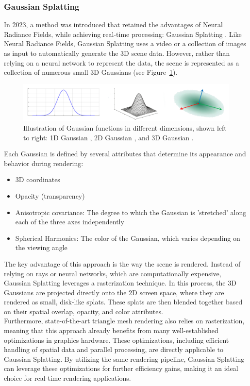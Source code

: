 \documentclass[12pt]{article}
\begin{document}
\subsubsection{Gaussian Splatting}
In 2023, a method was introduced that retained the advantages of Neural Radiance Fields, while achieving real-time processing: Gaussian Splatting \cite{OriginalSplatting}. Like Neural Radiance Fields, Gaussian Splatting uses a video or a collection of images as input to automatically generate the 3D scene data. However, rather than relying on a neural network to represent the data, the scene is represented as a collection of numerous small 3D Gaussians (see Figure~\ref{fig:Form}).
\begin{figure}[h!]
	\centering
	\includegraphics[width=\textwidth]{Images/GaussianForm.png}
	\caption{Illustration of Gaussian functions in different dimensions, shown left to right: 1D Gaussian \cite{1DGaussian}, 2D Gaussian \cite{2DGaussian}, and 3D Gaussian \cite{3DGaussian}.}
	\label{fig:Form}
\end{figure}
\newpage  \noindent
Each Gaussian is defined by several attributes that determine its appearance and behavior during rendering:
\begin{itemize}
	\item 3D coordinates
	\item Opacity (transparency)
	\item Anisotropic covariance: The degree to which the Gaussian is 'stretched' along each of the three axes independently
	\item Spherical Harmonics: The color of the Gaussian, which varies depending on the viewing angle
\end{itemize}
The key advantage of this approach is the way the scene is rendered. Instead of relying on rays or neural networks, which are computationally expensive, Gaussian Splatting leverages a rasterization technique. In this process, the 3D Gaussians are projected directly onto the 2D screen space, where they are rendered as small, disk-like splats. These splats are then blended together based on their spatial overlap, opacity, and color attributes.\\
Furthermore, state-of-the-art triangle mesh rendering also relies on rasterization, meaning that this approach already benefits from many well-established optimizations in graphics hardware. These optimizations, including efficient handling of spatial data and parallel processing, are directly applicable to Gaussian Splatting. By utilizing the same rendering pipeline, Gaussian Splatting can leverage these optimizations for further efficiency gains, making it an ideal choice for real-time rendering applications.
\end{document}
